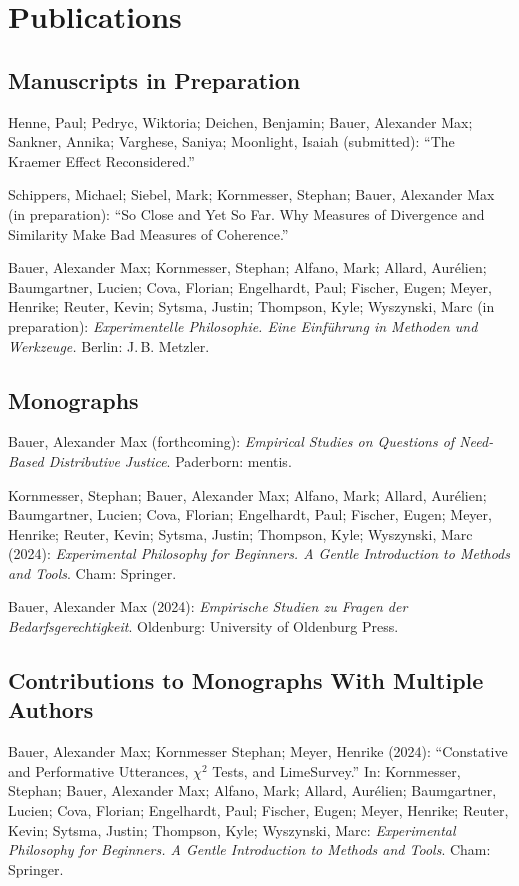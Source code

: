 \documentclass[a4paper,10pt]{article}
\newenvironment{literature}{%
   \parskip6pt\parindent0pt\raggedright
   \def\lititem{\hangindent=1cm\hangafter1}}{%
   \par\ignorespaces}
\begin{document}
\clearpage
\section{Publications}
\subsection*{Manuscripts in Preparation}
\begin{literature}
\lititem Henne, Paul; Pedryc, Wiktoria; Deichen, Benjamin; Bauer, Alexander Max; Sankner, Annika; Varghese, Saniya; Moonlight, Isaiah (submitted): \enquote{The Kraemer Effect Reconsidered.}

\lititem Schippers, Michael; Siebel, Mark; Kornmesser, Stephan; Bauer, Alexander Max (in preparation): \enquote{So Close and Yet So Far. Why Measures of Divergence and Similarity Make Bad Measures of Coherence.}

\lititem Bauer, Alexander Max; Kornmesser, Stephan; Alfano, Mark; Allard, Aurélien; Baumgartner, Lucien; Cova, Florian; Engelhardt, Paul; Fischer, Eugen; Meyer, Henrike; Reuter, Kevin; Sytsma, Justin; Thompson, Kyle; Wyszynski, Marc (in preparation): \textit{Experimentelle Philosophie. Eine Einführung in Methoden und Werkzeuge.} Berlin: J.\,B. Metzler.
\end{literature}

\subsection*{Monographs}
\begin{literature}
\lititem Bauer, Alexander Max (forthcoming): \textit{Empirical Studies on Questions of Need-Based Distributive Justice}. Paderborn: mentis.

\lititem Kornmesser, Stephan; Bauer, Alexander Max; Alfano, Mark; Allard, Aurélien; Baumgartner, Lucien; Cova, Florian; Engelhardt, Paul; Fischer, Eugen; Meyer, Henrike; Reuter, Kevin; Sytsma, Justin; Thompson, Kyle; Wyszynski, Marc (2024): \textit{Experimental Philosophy for Beginners. A Gentle Introduction to Methods and Tools}. Cham: Springer.

\lititem Bauer, Alexander Max (2024): \textit{Empirische Studien zu Fragen der Bedarfsgerechtigkeit}. Oldenburg: University of Oldenburg Press.
\end{literature}

\subsection*{Contributions to Monographs With Multiple Authors}
\begin{literature}
\lititem Bauer, Alexander Max; Kornmesser Stephan; Meyer, Henrike (2024): \enquote{Constative and Performative Utterances, $\chi^2$ Tests, and LimeSurvey.} In: Kornmesser, Stephan; Bauer, Alexander Max; Alfano, Mark; Allard, Aurélien; Baumgartner, Lucien; Cova, Florian; Engelhardt, Paul; Fischer, Eugen; Meyer, Henrike; Reuter, Kevin; Sytsma, Justin; Thompson, Kyle; Wyszynski, Marc: \textit{Experimental Philosophy for Beginners. A Gentle Introduction to Methods and Tools}. Cham: Springer.
\end{literature}
\end{document}
